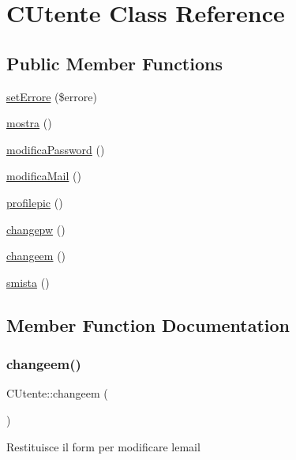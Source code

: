 \hypertarget{class_c_utente}{}\section{C\+Utente Class Reference}
\label{class_c_utente}
\subsection*{Public Member Functions}
\begin{DoxyCompactItemize}
\item 
\mbox{\hyperlink{class_c_utente_a24aea1e55f730c87ebd735c737f91b9f}{set\+Errore}} (\$errore)
\item 
\mbox{\hyperlink{class_c_utente_a2138fc71f3c210935adf5014516f1c25}{mostra}} ()
\item 
\mbox{\hyperlink{class_c_utente_a9a481981f75ef84d57cd83aaada7b1c1}{modifica\+Password}} ()
\item 
\mbox{\hyperlink{class_c_utente_a54eb20a68010ef23c17edbf5cf6f3487}{modifica\+Mail}} ()
\item 
\mbox{\hyperlink{class_c_utente_a1d4de927464fda3e5bc51df989356843}{profilepic}} ()
\item 
\mbox{\hyperlink{class_c_utente_adf02d17b2d62f9b23307762f1eff4810}{changepw}} ()
\item 
\mbox{\hyperlink{class_c_utente_a403b402f39c322e2a247672ef9797cd7}{changeem}} ()
\item 
\mbox{\hyperlink{class_c_utente_a8f3f8bb1dda55eda00a1f13281bcd0f4}{smista}} ()
\end{DoxyCompactItemize}


\subsection{Member Function Documentation}
\mbox{\label{class_c_utente_a403b402f39c322e2a247672ef9797cd7}} 
\subsubsection{\texorpdfstring{changeem()}{changeem()}}
{\footnotesize\ttfamily C\+Utente\+::changeem (\begin{DoxyParamCaption}{ }\end{DoxyParamCaption})}

Restituisce il form per modificare l\textquotesingle{}email

